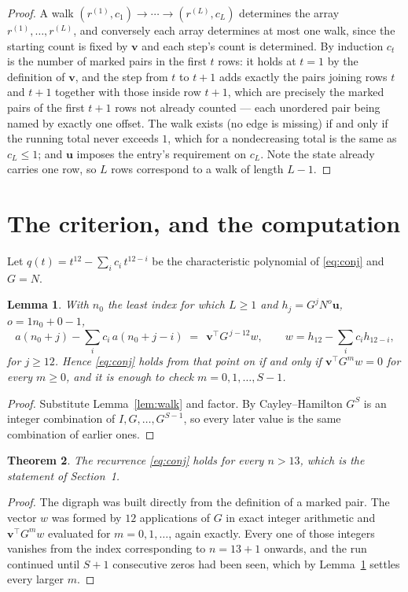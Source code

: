 \documentclass[11pt,a4paper]{article}
\theoremstyle{plain}
\newtheorem{theorem}{Theorem}
\newtheorem{lemma}[theorem]{Lemma}
\theoremstyle{definition}
\begin{document}
\begin{proof}
A walk $(r^{(1)},c_1)\to\cdots\to(r^{(L)},c_L)$ determines the array
$r^{(1)},\dots,r^{(L)}$, and conversely each array determines at most one walk, since the
starting count is fixed by $\mathbf{v}$ and each step's count is determined. By induction
$c_t$ is the number of marked pairs in the first $t$ rows: it holds at $t=1$ by the
definition of $\mathbf{v}$, and the step from $t$ to $t+1$ adds exactly the pairs joining
rows $t$ and $t+1$ together with those inside row $t+1$, which are precisely the marked
pairs of the first $t+1$ rows not already counted --- each unordered pair being named by
exactly one offset. The walk exists (no edge is missing) if and only if the running total
never exceeds $1$, which for a nondecreasing total is the same as $c_L\le1$; and
$\mathbf{u}$ imposes the entry's requirement on $c_L$. Note the state already carries one
row, so $L$ rows correspond to a walk of length $L-1$.
\end{proof}

\section{The criterion, and the computation}

Let $q(t)=t^{12}-\sum_i c_i\,t^{12-i}$ be the characteristic polynomial of
\eqref{eq:conj} and $G=N$.

\begin{lemma}\label{lem:crit}
With $n_0$ the least index for which $L\ge1$ and $h_j=G^{j}N^{o}\mathbf{u}$,
$o=1n_0+0-1$,
\[
a(n_0+j)-\sum_i c_i\,a(n_0+j-i)\;=\;\,\mathbf{v}^{\!\top}G^{\,j-12}w,
\qquad w=h_{12}-\sum_i c_i h_{12-i},
\]
for $j\ge12$. Hence \eqref{eq:conj} holds from that point on if and only if
$\mathbf{v}^{\!\top}G^{m}w=0$ for every $m\ge0$, and it is enough to check
$m=0,1,\dots,S-1$.
\end{lemma}

\begin{proof}
Substitute Lemma~\ref{lem:walk} and factor. By Cayley--Hamilton $G^{S}$ is an integer
combination of $I,G,\dots,G^{S-1}$, so every later value is the same combination of earlier
ones.
\end{proof}

\begin{theorem}
The recurrence \eqref{eq:conj} holds for every $n>13$, which is the statement of
Section~1.
\end{theorem}

\begin{proof}
The digraph was built directly from the definition of a marked pair. The vector $w$ was
formed by $12$ applications of $G$ in exact integer arithmetic and
$\mathbf{v}^{\!\top}G^{m}w$ evaluated for $m=0,1,\dots$, again exactly. Every one of
those integers vanishes from the index corresponding to $n=13+1$ onwards, and the run
continued until $S+1$ consecutive zeros had been seen, which by Lemma~\ref{lem:crit}
settles every larger $m$.
\end{proof}
\end{document}

